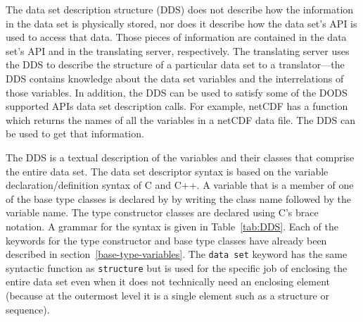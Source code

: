 The data set description structure (DDS) does not describe how the information
in the data set is physically stored, nor does it describe how the data set's
API is used to access that data. Those pieces of information are contained in
the data set's API and in the translating server, respectively.  The
translating server uses the DDS to describe the structure of a particular
data set to a translator---the DDS contains knowledge about the data set
variables and the interrelations of those variables.  In addition, the DDS
can be used to satisfy some of the DODS supported APIs data set description
calls. For example, netCDF has a function which returns the names of all the
variables in a netCDF data file. The DDS can be used to get that information.

The DDS is a textual description of the variables and their classes that
comprise the entire data set. The data set descriptor syntax is based on the
variable declaration/definition syntax of C and C++. A variable that is a
member of one of the base type classes is declared by by writing the class
name followed by the variable name. The type constructor classes are declared
using C's brace notation. A grammar for the syntax is given in
Table~\ref{tab:DDS}. Each of the keywords for the type constructor and base
type classes have already been described in
section~\ref{base-type-variables}. The {\tt data set} keyword has the same
syntactic function as {\tt structure} but is used for the specific job of
enclosing the entire data set even when it does not technically need an
enclosing element (because at the outermost level it is a single element such
as a structure or sequence).

